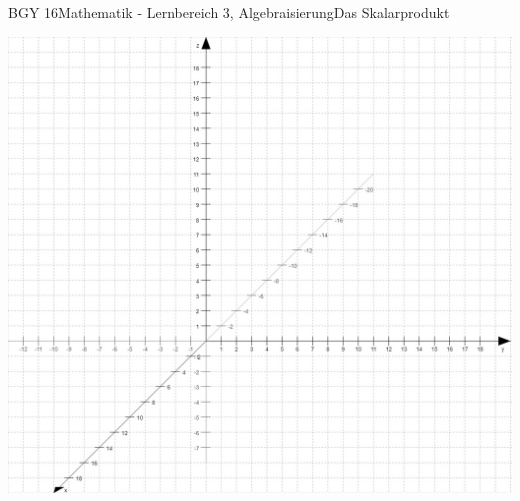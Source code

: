 \documentclass[oneside,openany,headings=optiontotoc,11pt,numbers=noenddot]{scrreprt}
\begin{document}
	\begin{worksheet}{BGY 16}{Mathematik - Lernbereich 3, Algebraisierung}{Das Skalarprodukt}
				
		\begin{framed}
			\noindent
			\begin{center}
				\includegraphics[scale=0.7]{Bilder/Koord3D.jpg}\\
			\end{center}
		\end{framed}
	\end{worksheet}
\end{document}
